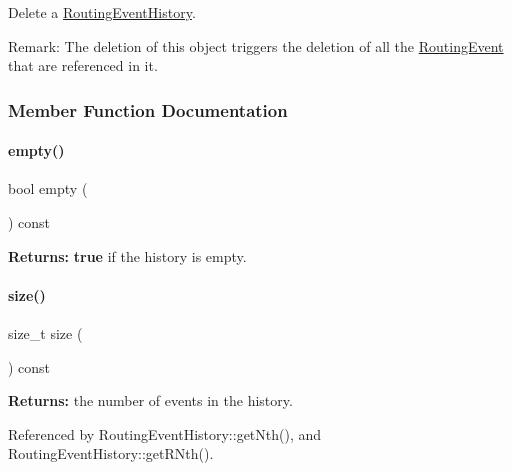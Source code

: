 Delete a \mbox{\hyperlink{classKite_1_1RoutingEventHistory}{Routing\+Event\+History}}.

\begin{DoxyParagraph}{Remark\+: The deletion of this object triggers the deletion of}
all the \mbox{\hyperlink{classKite_1_1RoutingEvent}{Routing\+Event}} that are referenced in it. 
\end{DoxyParagraph}


\subsubsection{Member Function Documentation}
\mbox{\label{classKite_1_1RoutingEventHistory_a644718bb2fb240de962dc3c9a1fdf0dc}} 
\paragraph{\texorpdfstring{empty()}{empty()}}
{\footnotesize\ttfamily bool empty (\begin{DoxyParamCaption}{ }\end{DoxyParamCaption}) const\hspace{0.3cm}{\ttfamily [inline]}}

{\bfseries Returns\+:} {\bfseries true} if the history is empty. \mbox{\label{classKite_1_1RoutingEventHistory_a259cb5a711406a8c3e5d937eb9350cca}} 
\paragraph{\texorpdfstring{size()}{size()}}
{\footnotesize\ttfamily size\+\_\+t size (\begin{DoxyParamCaption}{ }\end{DoxyParamCaption}) const\hspace{0.3cm}{\ttfamily [inline]}}

{\bfseries Returns\+:} the number of events in the history. 

Referenced by Routing\+Event\+History\+::get\+Nth(), and Routing\+Event\+History\+::get\+R\+Nth().

